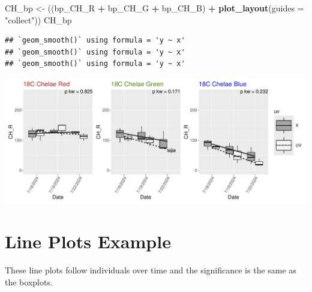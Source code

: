 \documentclass[
]{article}
\newenvironment{Shaded}{\begin{snugshade}}{\end{snugshade}}
\newcommand{\AttributeTok}[1]{\textcolor[rgb]{0.13,0.29,0.53}{#1}}
\newcommand{\FunctionTok}[1]{\textcolor[rgb]{0.13,0.29,0.53}{\textbf{#1}}}
\newcommand{\NormalTok}[1]{#1}
\newcommand{\OtherTok}[1]{\textcolor[rgb]{0.56,0.35,0.01}{#1}}
\newcommand{\SpecialCharTok}[1]{\textcolor[rgb]{0.81,0.36,0.00}{\textbf{#1}}}
\newcommand{\StringTok}[1]{\textcolor[rgb]{0.31,0.60,0.02}{#1}}
\begin{document}
\begin{Shaded}
\begin{Highlighting}[]
\NormalTok{CH\_bp }\OtherTok{\textless{}{-}}\NormalTok{ ((bp\_CH\_R }\SpecialCharTok{+}\NormalTok{ bp\_CH\_G }\SpecialCharTok{+}\NormalTok{ bp\_CH\_B) }\SpecialCharTok{+} \FunctionTok{plot\_layout}\NormalTok{(}\AttributeTok{guides =} \StringTok{"collect"}\NormalTok{))}
\NormalTok{CH\_bp}
\end{Highlighting}
\end{Shaded}

\begin{verbatim}
## `geom_smooth()` using formula = 'y ~ x'
## `geom_smooth()` using formula = 'y ~ x'
## `geom_smooth()` using formula = 'y ~ x'
\end{verbatim}

\includegraphics{color_analysis_pdf_files/figure-latex/Boxplots Example-1.pdf}

\section{Line Plots Example}\label{line-plots-example}

These line plots follow individuals over time and the significance is
the same as the boxplots.
\end{document}

